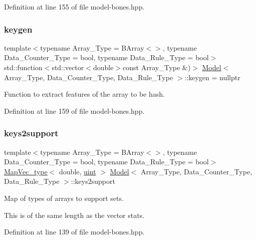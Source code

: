 Definition at line 155 of file model-\/bones.\+hpp.

\mbox{\label{class_model_a16561e15c0abbb080927382b30d43e35}} 
\subsubsection{\texorpdfstring{keygen}{keygen}}
{\footnotesize\ttfamily template$<$typename Array\+\_\+\+Type = B\+Array$<$$>$, typename Data\+\_\+\+Counter\+\_\+\+Type = bool, typename Data\+\_\+\+Rule\+\_\+\+Type = bool$>$ \\
std\+::function$<$std\+::vector$<$double$>$const Array\+\_\+\+Type \&)$>$ \hyperlink{class_model}{Model}$<$ Array\+\_\+\+Type, Data\+\_\+\+Counter\+\_\+\+Type, Data\+\_\+\+Rule\+\_\+\+Type $>$\+::keygen = nullptr}



Function to extract features of the array to be hash. 



Definition at line 159 of file model-\/bones.\+hpp.

\mbox{\label{class_model_a2a81190ac618b04479686411d02b3c5f}} 
\subsubsection{\texorpdfstring{keys2support}{keys2support}}
{\footnotesize\ttfamily template$<$typename Array\+\_\+\+Type = B\+Array$<$$>$, typename Data\+\_\+\+Counter\+\_\+\+Type = bool, typename Data\+\_\+\+Rule\+\_\+\+Type = bool$>$ \\
\hyperlink{typedefs_8hpp_a02ed8dec96bc528c8bc3d8cb3c4674a5}{Map\+Vec\+\_\+type}$<$ double, \hyperlink{typedefs_8hpp_a91ad9478d81a7aaf2593e8d9c3d06a14}{uint} $>$ \hyperlink{class_model}{Model}$<$ Array\+\_\+\+Type, Data\+\_\+\+Counter\+\_\+\+Type, Data\+\_\+\+Rule\+\_\+\+Type $>$\+::keys2support}



Map of types of arrays to support sets. 

This is of the same length as the vector {\ttfamily stats}. 

Definition at line 139 of file model-\/bones.\+hpp.

\mbox{\label{class_model_a410caeff58afe605520c878a0689abf5}} 
